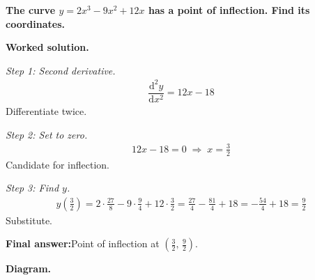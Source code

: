 \documentclass[11pt]{article}
\newcommand{\question}[1]{\par\medskip\noindent\textbf{#1}\par}
\begin{document}
\question{The curve \( y = 2x^3 - 9x^2 + 12x \) has a point of inflection. Find its coordinates.}

\textbf{Worked solution.}

\textit{Step 1: Second derivative.}
\[\begin{gathered}
\dfrac{\mathrm{d}^2y}{\mathrm{d}x^2} = 12x - 18
\end{gathered}\]
Differentiate twice.

\textit{Step 2: Set to zero.}
\[\begin{gathered}
12x - 18 = 0 \;\Rightarrow\; x = \tfrac{3}{2}
\end{gathered}\]
Candidate for inflection.

\textit{Step 3: Find \( y \).}
\[\begin{gathered}
y\!\left(\tfrac{3}{2}\right) = 2 \cdot \tfrac{27}{8} - 9 \cdot \tfrac{9}{4} + 12 \cdot \tfrac{3}{2} = \tfrac{27}{4} - \tfrac{81}{4} + 18 = -\tfrac{54}{4} + 18 = \tfrac{9}{2}
\end{gathered}\]
Substitute.

\begin{answerbox}
\textbf{Final answer:}\quad Point of inflection at \(\displaystyle  \left(\tfrac{3}{2},\, \tfrac{9}{2}\right) \).
\end{answerbox}
\textbf{Diagram.}
\end{document}
